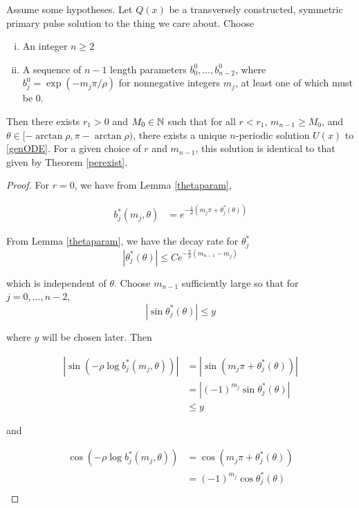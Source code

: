 \documentclass[thesis.tex]{subfiles}
\begin{document}
\begin{theorem}\label{unifperexist}
Assume some hypotheses. Let $Q(x)$ be a transversely constructed, symmetric primary pulse solution to the thing we care about. Choose

\begin{enumerate}[(i)]
\item An integer $n \geq 2$ 
\item A sequence of $n-1$ length parameters $b_0^0, \dots, b_{n-2}^0$, where $b_j^0 = \exp(-m_j \pi / \rho )$ for nonnegative integers $m_j$, at least one of which must be 0.
\end{enumerate}

Then there exists $r_1 > 0$ and $M_0 \in {\mathbb N}$ such that for all $r < r_1$, $m_{n-1} \geq M_0$, and $\theta \in [-\arctan \rho, \pi - \arctan \rho)$, there exists a unique $n$-periodic solution $U(x)$ to \eqref{genODE}. For a given choice of $r$ and $m_{n-1}$, this solution is identical to that given by Theorem \ref{perexist}.

\begin{proof}
For $r = 0$, we have from Lemma \ref{thetaparam},

\begin{align*}
b_j^*(m_j, \theta) &= e^{-\frac{1}{\rho}(m_j \pi + \theta_j^*(\theta)) }
\end{align*}

From Lemma \ref{thetaparam}, we have the decay rate for $\theta^*_j$
\[
|\theta_j^*(\theta)| \leq C e^{ -\frac{\pi}{\rho}(m_{n-1} - m_j)}
\]

which is independent of $\theta$. Choose $m_{n-1}$ sufficiently large so that for $j = 0, \dots, n-2$,
\[
|\sin \theta_j^*(\theta)| \leq y
\]

where $y$ will be chosen later. Then

\begin{align*}
|\sin \left( -\rho \log b_j^*(m_j, \theta) \right)| 
&= |\sin \left( m_j \pi + \theta_j^*(\theta) \right)| \\
&= |(-1)^{m_j} \sin \theta_j^*(\theta)| \\
&\leq y
\end{align*}

and

\begin{align*}
\cos \left( -\rho \log b_j^*(m_j, \theta) \right) 
&= \cos \left( m_j \pi + \theta_j^*(\theta) \right) \\
&= (-1)^{m_j} \cos \theta_j^*(\theta) \\
\end{align*}


\end{proof}
\end{theorem}
\end{document}
